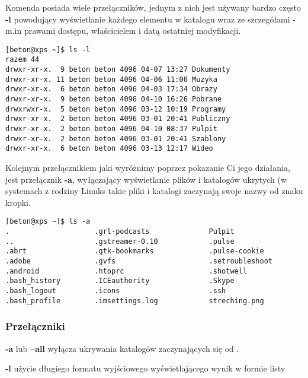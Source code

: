Komenda posiada wiele przełączników, jednym z nich jest używany bardzo często \textbf{-l} powodujący wyświetlanie każdego elementu w katalogu wraz ze szczegółami - m.in prawami dostępu, właścicielem i datą ostatniej modyfikacji.
\begin{verbatim}
[beton@xps ~]$ ls -l
razem 44
drwxr-xr-x.  9 beton beton 4096 04-07 13:27 Dokumenty
drwxr-xr-x. 11 beton beton 4096 04-06 11:00 Muzyka
drwxr-xr-x.  6 beton beton 4096 04-03 17:34 Obrazy
drwxr-xr-x.  9 beton beton 4096 04-10 16:26 Pobrane
drwxrwxr-x.  5 beton beton 4096 03-12 10:19 Programy
drwxr-xr-x.  2 beton beton 4096 03-01 20:41 Publiczny
drwxr-xr-x.  2 beton beton 4096 04-10 08:37 Pulpit
drwxr-xr-x.  2 beton beton 4096 03-01 20:41 Szablony
drwxr-xr-x.  6 beton beton 4096 03-13 12:17 Wideo
\end{verbatim}
Kolejnym przełącznikiem jaki wyróżnimy poprzez pokazanie Ci jego działania, jest przełącznik \textbf{-a}, wyłączający wyświetlanie plików i katalogów ukrytych (w systemach z rodziny Linuks takie pliki i katalogi zaczynają swoje nazwy od znaku kropki.
\begin{verbatim}
[beton@xps ~]$ ls -a
.                    .grl-podcasts              Pulpit
..                   .gstreamer-0.10            .pulse
.abrt                .gtk-bookmarks             .pulse-cookie
.adobe               .gvfs                      .setroubleshoot
.android             .htoprc                    .shotwell
.bash_history        .ICEauthority              .Skype
.bash_logout         .icons                     .ssh
.bash_profile        .imsettings.log            streching.png
\end{verbatim}
\subsubsection*{Przełączniki}
\begin{description}
\item \textbf{-a} lub \textbf{--all} wyłącza ukrywania katalogów zaczynających się od .
\item \textbf{-l} użycie długiego formatu wyjściowego wyświetlającego wynik w formie listy
\end{description}

